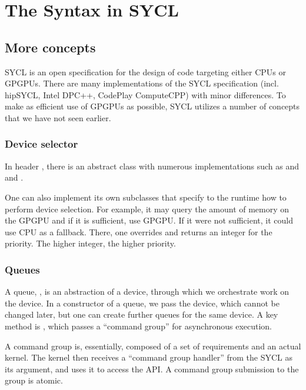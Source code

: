 \chapter{The Syntax in SYCL}

\section{More concepts}

SYCL is an open specification for the design of code targeting either CPUs or GPGPUs. 
There are many implementations of the SYCL specification (incl. hipSYCL, Intel DPC++, CodePlay ComputeCPP)
with minor differences. 
To make as efficient use of GPGPUs as possible, SYCL utilizes a number of concepts that 
we have not seen earlier.

\subsection{Device selector}

In header , there is an abstract class  with numerous implementations
such as  and  and .

One can also implement its own subclasses that specify to the runtime how to perform device selection.
For example, it may query the amount of memory on the GPGPU and if it is sufficient, 
use GPGPU. If it were not sufficient, it could use CPU as a fallback. 
There, one overrides 
and returns an integer for the priority. The higher integer, the higher priority. 

\subsection{Queues}

A queue, , is an abstraction of a device,
through which we orchestrate work on the device.
In a constructor of a queue, we pass the device, which cannot be changed later,
but one can create further queues for the same device.
A key method is ,
which passes a ``command group'' for asynchronous execution. 

A command group is, essentially, composed of a set of requirements and an actual kernel. 
The kernel then receives a ``command group handler'' from the SYCL as its argument,
and uses it to access the API. 
A command group submission to the group is atomic.  

